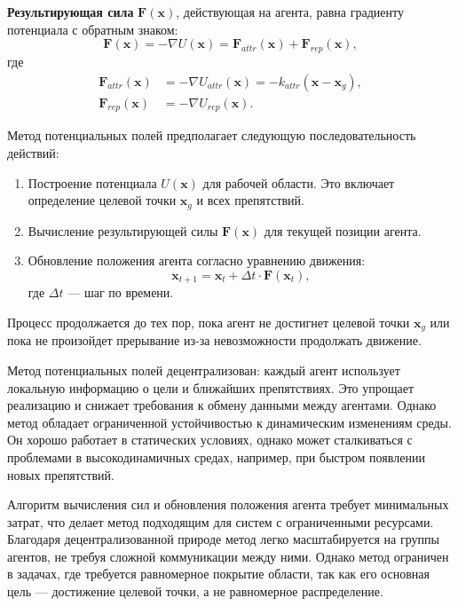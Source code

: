 \textbf{Результирующая сила} $\mathbf{F}(\mathbf{x})$, действующая на агента, равна градиенту потенциала с обратным знаком:
\begin{equation}
	\mathbf{F}(\mathbf{x}) = -\nabla U(\mathbf{x}) = \mathbf{F}_{attr}(\mathbf{x}) + \mathbf{F}_{rep}(\mathbf{x}),
\end{equation}
где
\begin{align}
	\mathbf{F}_{attr}(\mathbf{x}) &= -\nabla U_{attr}(\mathbf{x}) = -k_{attr}(\mathbf{x} - \mathbf{x}_g), \\
	\mathbf{F}_{rep}(\mathbf{x}) &= -\nabla U_{rep}(\mathbf{x}).
\end{align}

Метод потенциальных полей предполагает следующую последовательность действий:
\begin{enumerate}
	\item Построение потенциала $U(\mathbf{x})$ для рабочей области. Это включает определение целевой точки $\mathbf{x}_g$ и всех препятствий.
	\item Вычисление результирующей силы $\mathbf{F}(\mathbf{x})$ для текущей позиции агента.
	\item Обновление положения агента согласно уравнению движения:
	\begin{equation}
		\mathbf{x}_{t+1} = \mathbf{x}_t + \Delta t \cdot \mathbf{F}(\mathbf{x}_t),
	\end{equation}
	где $\Delta t$ — шаг по времени.
\end{enumerate}
Процесс продолжается до тех пор, пока агент не достигнет целевой точки $\mathbf{x}_g$ или пока не произойдет прерывание из-за невозможности продолжать движение.

Метод потенциальных полей децентрализован: каждый агент использует локальную информацию о цели и ближайших препятствиях. Это упрощает реализацию и снижает требования к обмену данными между агентами. Однако метод обладает ограниченной устойчивостью к динамическим изменениям среды. Он хорошо работает в статических условиях, однако может сталкиваться с проблемами в высокодинамичных средах, например, при быстром появлении новых препятствий.

Алгоритм вычисления сил и обновления положения агента требует минимальных затрат, что делает метод подходящим для систем с ограниченными ресурсами. Благодаря децентрализованной природе метод легко масштабируется на группы агентов, не требуя сложной коммуникации между ними. Однако метод ограничен в задачах, где требуется равномерное покрытие области, так как его основная цель — достижение целевой точки, а не равномерное распределение.

